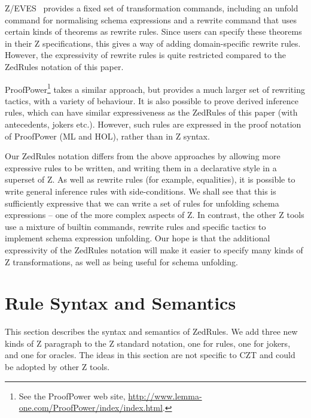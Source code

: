 \documentclass{entcs}
\begin{document}
Z/EVES~\cite{zeves:98} provides a fixed set of transformation
commands, including an unfold command for normalising schema
expressions and a rewrite command that uses certain kinds of theorems
as rewrite rules.  Since users can specify these theorems in their Z
specifications, this gives a way of adding domain-specific rewrite
rules.  However, the expressivity of rewrite rules is quite restricted
compared to the ZedRules notation of this paper.

ProofPower\footnote{See the ProofPower web site,
\url{http://www.lemma-one.com/ProofPower/index/index.html}.} takes a
similar approach, but provides a much larger set of rewriting tactics,
with a variety of behaviour.  It is also possible to prove derived
inference rules, which can have similar expressiveness as the ZedRules
of this paper (with antecedents, jokers etc.).  However, such rules
are expressed in the proof notation of ProofPower (ML and HOL), rather
than in Z syntax.

Our ZedRules notation differs from the above approaches by allowing more
expressive rules to be written, and writing them in a declarative style in
a superset of Z.  As well as rewrite rules (for example, equalities), it is
possible to write general inference rules with side-conditions.  We shall
see that this is sufficiently expressive that we can write a set of rules
for unfolding schema expressions -- one of the more complex aspects of Z.
In contrast, the other Z tools use a mixture of builtin commands, rewrite
rules and specific tactics to implement schema expression unfolding.  Our
hope is that the additional expressivity of the ZedRules notation will make
it easier to specify many kinds of Z transformations, as well as being
useful for schema unfolding.




\section{Rule Syntax and Semantics} \label{sec:syntax}

This section describes the syntax and semantics of ZedRules.  We add
three new kinds of Z paragraph to the Z standard notation, one for
rules, one for jokers, and one for oracles.  The ideas in this section
are not specific to CZT and could be adopted by other Z tools.
\end{document}
